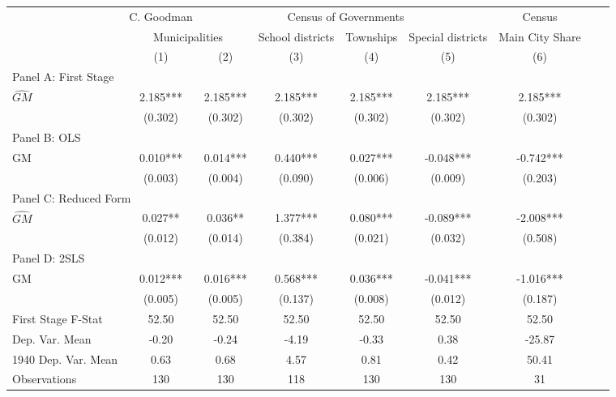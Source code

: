  \begin{tabular}{l*{8}{c}} \toprule
&\multicolumn{1}{c}{C. Goodman}&\multicolumn{4}{c}{Census of Governments}&\multicolumn{1}{c}{Census}\\\cmidrule(lr){2-2}\cmidrule(lr){3-6}\cmidrule(lr){7-7}
&\multicolumn{2}{c}{Municipalities}&\multicolumn{1}{c}{School districts}&\multicolumn{1}{c}{Townships}&\multicolumn{1}{c}{Special districts}&\multicolumn{1}{c}{Main City Share}\\\cmidrule(lr){2-3}\cmidrule(lr){4-6}\cmidrule(lr){7-7}
&\multicolumn{1}{c}{(1)}&\multicolumn{1}{c}{(2)}&\multicolumn{1}{c}{(3)}&\multicolumn{1}{c}{(4)}&\multicolumn{1}{c}{(5)}&\multicolumn{1}{c}{(6)}\\
\cmidrule(lr){1-7}
\multicolumn{6}{l}{Panel A: First Stage}\\
\cmidrule(lr){1-7}
$\widehat{GM}$  &    2.185***&    2.185***&    2.185***&    2.185***&    2.185***&    2.185***\\
                &  (0.302)   &  (0.302)   &  (0.302)   &  (0.302)   &  (0.302)   &  (0.302)   \\
\cmidrule(lr){1-7}
\multicolumn{6}{l}{Panel B: OLS}\\
\cmidrule(lr){1-7}
GM              &    0.010***&    0.014***&    0.440***&    0.027***&   -0.048***&   -0.742***\\
                &  (0.003)   &  (0.004)   &  (0.090)   &  (0.006)   &  (0.009)   &  (0.203)   \\
\cmidrule(lr){1-7}
\multicolumn{6}{l}{Panel C: Reduced Form}\\
\cmidrule(lr){1-7}
$\widehat{GM}$  &    0.027** &    0.036** &    1.377***&    0.080***&   -0.089***&   -2.008***\\
                &  (0.012)   &  (0.014)   &  (0.384)   &  (0.021)   &  (0.032)   &  (0.508)   \\
\cmidrule(lr){1-7}
\multicolumn{6}{l}{Panel D: 2SLS}\\
\cmidrule(lr){1-7}
GM              &    0.012***&    0.016***&    0.568***&    0.036***&   -0.041***&   -1.016***\\
                &  (0.005)   &  (0.005)   &  (0.137)   &  (0.008)   &  (0.012)   &  (0.187)   \\
\midrule
First Stage F-Stat&    52.50   &    52.50   &    52.50   &    52.50   &    52.50   &    52.50   \\
Dep. Var. Mean  &    -0.20   &    -0.24   &    -4.19   &    -0.33   &     0.38   &   -25.87   \\
1940 Dep. Var. Mean&     0.63   &     0.68   &     4.57   &     0.81   &     0.42   &    50.41   \\
Observations    &      130   &      130   &      118   &      130   &      130   &       31   \\
       \bottomrule \end{tabular}
